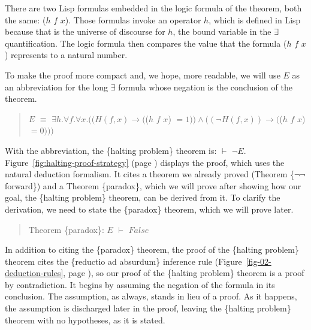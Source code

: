 There are two Lisp formulas embedded in
the logic formula of the theorem, both the same:
($h$ $f$ $x$).
Those formulas invoke an operator $h$, which is defined in Lisp because that is the universe
of discourse for $h$, the bound variable in the $\exists$ quantification.
The logic formula then compares the value that
the formula ($h$ $f$ $x$) represents to a natural number.

To make the proof more compact and, we hope, more readable,
we will use $E$ as an abbreviation for the
long $\exists$ formula whose negation is the conclusion of the theorem.
\begin{quote}
$E$ $\equiv$ $\exists h. \forall f. \forall x.
((H(f, x) \rightarrow ($($h$ $f$ $x$) $ = 1)) \wedge ((\neg H(f, x)) \rightarrow ($($h$ $f$ $x$) $= 0)))$
\end{quote}

With the abbreviation, the \{halting problem\} theorem is: $\vdash$ $\neg E$.
Figure~\ref{fig:halting-proof-strategy} (page \pageref{fig:halting-proof-strategy})
displays the proof, which uses the natural deduction formalism.
It cites a theorem we already proved (Theorem \{$\neg \neg$ forward\}) and
a Theorem \{paradox\}, which we will prove
after showing how our goal, the \{halting problem\} theorem,
can be derived from it.
To clarify the derivation, we need to state the \{paradox\} theorem,
which we will prove later.
\begin{quote}
Theorem \{paradox\}: $E$ $\vdash$ $False$
\end{quote}

In addition to citing the \{paradox\} theorem,
the proof of the \{halting problem\} theorem
cites the \{reductio ad absurdum\} inference rule
(Figure~\ref{fig-02-deduction-rules}, page \pageref{fig-02-deduction-rules}),
so our proof of the \{halting problem\} theorem is a proof by contradiction.
It begins by assuming the negation of the formula in its conclusion.
The assumption, as always, stands in lieu of a proof.
As it happens, the assumption is discharged later in the proof,
leaving the \{halting problem\} theorem with no hypotheses,
as it is stated.

